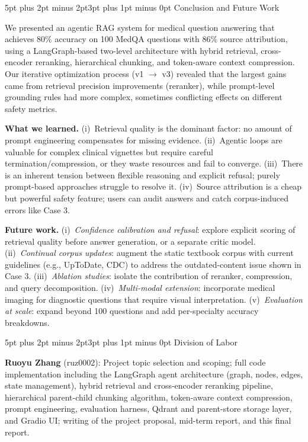 \documentclass[10pt,twocolumn,letterpaper]{article}
\makeatletter
\renewcommand\section{\@startsection{section}{1}{\z@}%
  {5pt plus 2pt minus 2pt}{3pt plus 1pt minus 0pt}%
  {\large\bfseries}}
\makeatother
\begin{document}
\section{Conclusion and Future Work}

We presented an agentic RAG system for medical question answering that achieves 80\% accuracy on 100 MedQA questions with 86\% source attribution, using a LangGraph-based two-level architecture with hybrid retrieval, cross-encoder reranking, hierarchical chunking, and token-aware context compression. Our iterative optimization process (v1 $\to$ v3) revealed that the largest gains came from retrieval precision improvements (reranker), while prompt-level grounding rules had more complex, sometimes conflicting effects on different safety metrics.

\textbf{What we learned.}
(i)~Retrieval quality is the dominant factor: no amount of prompt engineering compensates for missing evidence.
(ii)~Agentic loops are valuable for complex clinical vignettes but require careful termination/compression, or they waste resources and fail to converge.
(iii)~There is an inherent tension between flexible reasoning and explicit refusal; purely prompt-based approaches struggle to resolve it.
(iv)~Source attribution is a cheap but powerful safety feature; users can audit answers and catch corpus-induced errors like Case 3.

\textbf{Future work.}
(i)~\emph{Confidence calibration and refusal}: explore explicit scoring of retrieval quality before answer generation, or a separate critic model.
(ii)~\emph{Continual corpus updates}: augment the static textbook corpus with current guidelines (e.g., UpToDate, CDC) to address the outdated-content issue shown in Case 3.
(iii)~\emph{Ablation studies}: isolate the contribution of reranker, compression, and query decomposition.
(iv)~\emph{Multi-modal extension}: incorporate medical imaging for diagnostic questions that require visual interpretation.
(v)~\emph{Evaluation at scale}: expand beyond 100 questions and add per-specialty accuracy breakdowns.

\section{Division of Labor}

\textbf{Ruoyu Zhang} (ruz0002): Project topic selection and scoping; full code implementation including the LangGraph agent architecture (graph, nodes, edges, state management), hybrid retrieval and cross-encoder reranking pipeline, hierarchical parent-child chunking algorithm, token-aware context compression, prompt engineering, evaluation harness, Qdrant and parent-store storage layer, and Gradio UI; writing of the project proposal, mid-term report, and this final report.
\end{document}

